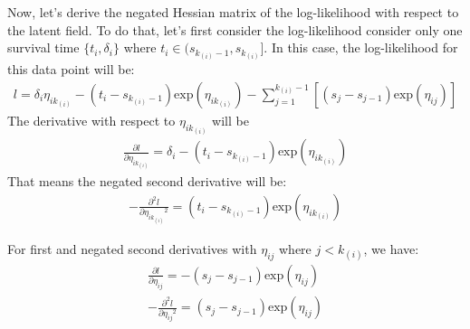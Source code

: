 \documentclass[]{article}
\begin{document}
Now, let's derive the negated Hessian matrix of the log-likelihood with
respect to the latent field. To do that, let's first consider the
log-likelihood consider only one survival time \(\{t_i,\delta_i\}\)
where \(t_i \in (s_{k_{(i)}-1},s_{k_{(i)}}]\). In this case, the
log-likelihood for this data point will be:
\begin{equation}\begin{aligned}\label{eqn:loglikeagain}
l = \delta_i \eta_{ik_{(i)}} - (t_i-s_{k_{(i)}-1})\text{exp}(\eta_{ik_{(i)}})-\sum_{j=1}^{k_{(i)}-1} [(s_{j}-s_{j-1})\text{exp}(\eta_{ij})]
\end{aligned}\end{equation} The derivative with respect to
\(\eta_{ik_{(i)}}\) will be\\
\begin{equation}\begin{aligned}\label{eqn:hessian}
\frac{\partial l}{\partial \eta_{ik_{(i)}}}= \delta_i -(t_i-s_{k_{(i)}-1})\text{exp}(\eta_{ik_{(i)}})
\end{aligned}\end{equation} That means the negated second derivative
will be: \begin{equation}\begin{aligned}\label{eqn:hessian1}
-\frac{\partial^2 l}{\partial {\eta_{ik_{(i)}}}^2} = (t_i-s_{k_{(i)}-1})\text{exp}(\eta_{ik_{(i)}})
\end{aligned}\end{equation}

For first and negated second derivatives with \(\eta_{ij}\) where
\(j<k_{(i)}\), we have:
\begin{equation}\begin{aligned}\label{eqn:hessian2}
\frac{\partial l}{\partial \eta_{ij}}= -(s_{j}-s_{j-1})\text{exp}(\eta_{ij})\\
-\frac{\partial^2 l}{\partial {\eta_{ij}}^2} = (s_{j}-s_{j-1})\text{exp}(\eta_{ij})
\end{aligned}\end{equation}
\end{document}
